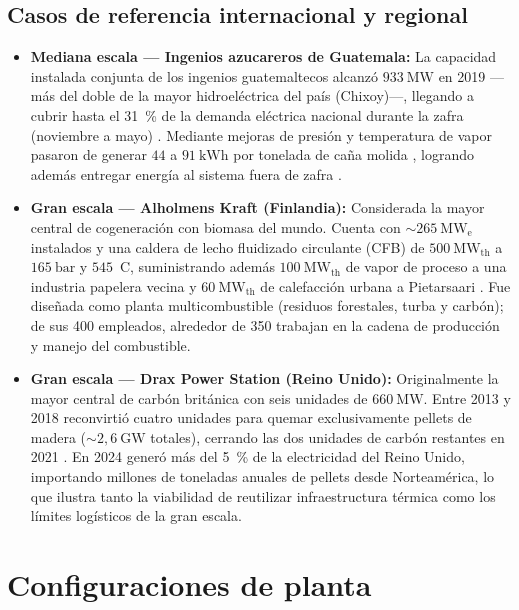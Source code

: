 \subsection{Casos de referencia internacional y regional}
\begin{itemize}[leftmargin=1.5em]
\item \textbf{Mediana escala --- Ingenios azucareros de Guatemala:} La capacidad instalada conjunta de los ingenios guatemaltecos alcanzó $933~\text{MW}$ en 2019 ---más del doble de la mayor hidroeléctrica del país (Chixoy)---, llegando a cubrir hasta el 31~\% de la demanda eléctrica nacional durante la zafra (noviembre a mayo) \cite{eyn2019guatemala}. Mediante mejoras de presión y temperatura de vapor pasaron de generar $44$ a $91~\text{kWh}$ por tonelada de caña molida \cite{er2018bagazo}, logrando además entregar energía al sistema fuera de zafra \cite{prensalatina2024guatemala}.
\item \textbf{Gran escala --- Alholmens Kraft (Finlandia):} Considerada la mayor central de cogeneración con biomasa del mundo. Cuenta con $\sim 265~\mathrm{MW_e}$ instalados y una caldera de lecho fluidizado circulante (CFB) de $500~\mathrm{MW_{th}}$ a $165~\text{bar}$ y $545$~\textdegree C, suministrando además $100~\mathrm{MW_{th}}$ de vapor de proceso a una industria papelera vecina y $60~\mathrm{MW_{th}}$ de calefacción urbana a Pietarsaari \cite{alholmenskraft, flynn2005alholmens}. Fue diseñada como planta multicombustible (residuos forestales, turba y carbón); de sus 400 empleados, alrededor de 350 trabajan en la cadena de producción y manejo del combustible.
\item \textbf{Gran escala --- Drax Power Station (Reino Unido):} Originalmente la mayor central de carbón británica con seis unidades de $660~\text{MW}$. Entre 2013 y 2018 reconvirtió cuatro unidades para quemar exclusivamente pellets de madera ($\sim 2{,}6~\text{GW}$ totales), cerrando las dos unidades de carbón restantes en 2021 \cite{drax2025annual}. En 2024 generó más del 5~\% de la electricidad del Reino Unido, importando millones de toneladas anuales de pellets desde Norteamérica, lo que ilustra tanto la viabilidad de reutilizar infraestructura térmica como los límites logísticos de la gran escala.
\end{itemize}

\section{Configuraciones de planta}
\label{sec:configuraciones}

